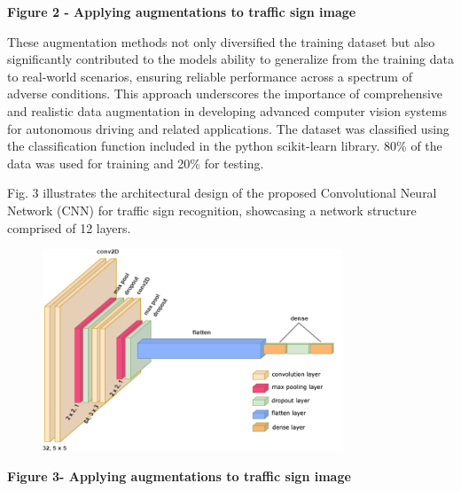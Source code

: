 {\bfseries Figure 2 - Applying augmentations to traffic sign image}

These augmentation methods not only diversified the training dataset but
also significantly contributed to the model\textquotesingle s ability to
generalize from the training data to real-world scenarios, ensuring
reliable performance across a spectrum of adverse conditions. This
approach underscores the importance of comprehensive and realistic data
augmentation in developing advanced computer vision systems for
autonomous driving and related applications. The dataset was classified
using the classification function included in the python scikit-learn
library. 80\% of the data was used for training and 20\% for testing.

Fig. 3 illustrates the architectural design of the proposed
Convolutional Neural Network (CNN) for traffic sign recognition,
showcasing a network structure comprised of 12 layers.

\begin{figure}[H]
	\centering
	\includegraphics[width=0.8\textwidth]{assets/59}
	\caption*{}
\end{figure}

{\bfseries Figure 3- Applying augmentations to traffic sign image}

